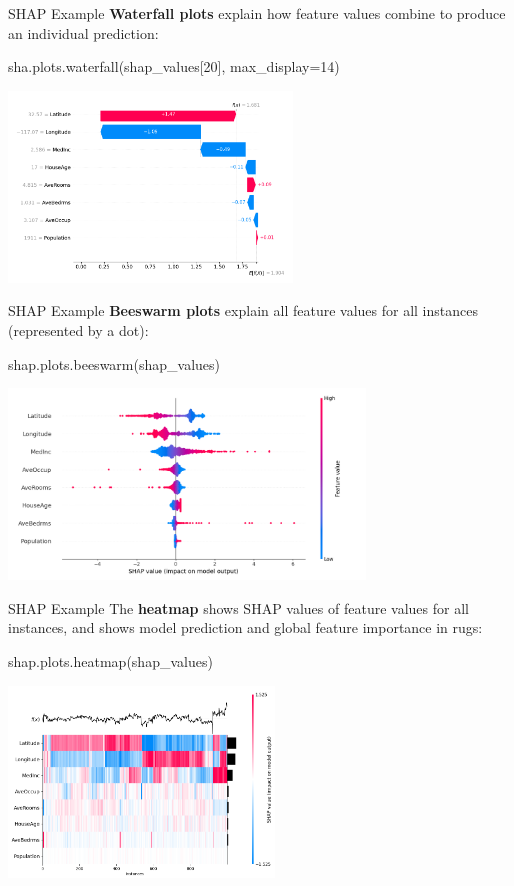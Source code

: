 \documentclass[ignorenonframetext,xcolor=x11names]{beamer}
\begin{document}
\begin{frame}[fragile]{SHAP Example}
\textbf{Waterfall plots} explain how feature values combine to produce an individual prediction:
\begin{pythoncode}
sha.plots.waterfall(shap_values[20], max_display=14)
\end{pythoncode}
\begin{center}
\includegraphics[height=2in]{shap_waterfall1.png}
\end{center}
\end{frame}

\begin{frame}[fragile]{SHAP Example}
\textbf{Beeswarm plots} explain all feature values for all instances (represented by a dot):
\begin{pythoncode}
shap.plots.beeswarm(shap_values)
\end{pythoncode}
\begin{center}
\includegraphics[height=2in]{shap_beeswarm1.png}
\end{center}
\end{frame}

\begin{frame}[fragile]{SHAP Example}
The \textbf{heatmap} shows SHAP values of feature values for all instances, and shows model prediction and global feature importance in rugs:
\begin{pythoncode}
shap.plots.heatmap(shap_values)
\end{pythoncode}
\begin{center}
\includegraphics[height=2in]{shap_heatmap1.png}
\end{center}
\end{frame}
\end{document}
